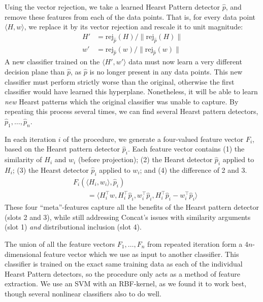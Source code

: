 \documentclass[12pt]{article}
\begin{document}
Using the vector rejection, we take a learned Hearst Pattern detector $\hat p$,
and remove these features from each of the data points. That is, for every data
point $\langle H, w\rangle$, we replace it by its vector rejection and rescale
it to unit magnitude:
\begin{align*}
  H' & = \text{rej}_{\hat p}(H) / \|\text{rej}_{\hat p}(H)\|\\
  w' & = \text{rej}_{\hat p}(w) / \|\text{rej}_{\hat p}(w)\|
\end{align*}
A new classifier trained on the $\langle H', w'\rangle$ data must now learn
a very different decision plane than $\hat p$, as $\hat p$ is no longer present
in any data points. This new classifier must perform strictly worse than the
original, otherwise the first classifier would have learned this hyperplane.
Nonetheless, it will be able to learn {\em new} Hearst patterns which the
original classifier was unable to capture. By repeating this process several
times, we can find several Hearst pattern detectors, $\hat p_1, \ldots, \hat
p_n$.

In each iteration $i$ of the procedure, we generate a four-valued feature vector
$F_i$, based on the Hearst pattern detector $\hat p_i$. Each
feature vector contains (1) the similarity of $H_i$ and $w_i$ (before projection);
(2) the Hearst detector
$\hat p_i$ applied to $H_i$; (3) the Hearst detector $\hat p_i$ applied to $w_i$; and
(4) the difference of 2 and 3.
\begin{align*}
  & F_i(\langle H_i, w_i\rangle, \hat p_i)\\
  & \qquad = \langle H_i^{\top}w, H_i^\top\hat p_i, w_i^\top\hat p_i, H_i^\top\hat p_i - w_i^\top\hat p_i\rangle
\end{align*}
These four ``meta''-features capture all the benefits of the Hearst pattern
detector (slots 2 and 3), while still addressing Concat's issues with
similarity arguments (slot 1) {\em and} distributional inclusion (slot 4).

The union of all the feature vectors $F_1, \ldots, F_n$ from repeated iteration form a
$4n$-dimensional feature vector which we use as input to another classifier.
This classifier is trained on the exact same training data as each of the
individual Hearst Pattern detectors, so the procedure only acts as a method of
feature extraction. We use an SVM with an RBF-kernel, as we found it to work
best, though several nonlinear classifiers also to do well.
\end{document}
